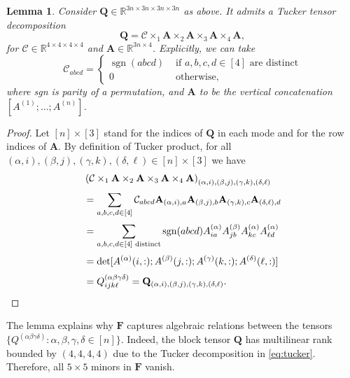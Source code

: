 \documentclass[11pt]{amsart}
\newtheorem{lemma}{Lemma}
\begin{document}
\begin{lemma}
\label{lem:identity}
Consider $\mathbf{Q} \in \mathbb{R}^{3n \times 3n \times 3n \times 3n}$ as above.  
It admits a Tucker tensor decomposition
\begin{equation}\label{eq:tucker}
\mathbf{Q} = \mathcal{C} \times_1 \mathbf{A} \times_2 \mathbf{A} \times_3 \mathbf{A} \times_4 \mathbf{A},
\end{equation}
for $\mathcal{C} \in \mathbb{R}^{4 \times 4 \times 4 \times 4}$ and $\mathbf{A} \in \mathbb{R}^{3n \times 4}$.  
Explicitly, we can take 
\begin{equation*}
\mathcal{C}_{abcd} = 
\begin{cases}
\operatorname{sgn}(abcd) & \text{ if } a,b,c,d \in [4] \text{ are distinct} \\
0 & \text{ otherwise},
\end{cases}
\end{equation*}
where sgn is parity of a permutation, and $\mathbf{A}$ to be the vertical concatenation $[A^{(1)}; \dots ; A^{(n)}]$.
\end{lemma}
\begin{proof}
Let $[n] \times [3]$ stand for the indices of $\mathbf{Q}$ in each mode and for the row indices of $\mathbf{A}$.
By definition of Tucker product, for all $(\alpha, i), (\beta, j), (\gamma, k), (\delta, \ell) \in [n] \times [3]$ we have
\begin{align*}
  &\left(\mathcal{C} \times_1 \mathbf{A} \times_2 \mathbf{A} \times_3 \mathbf{A} \times_4 \mathbf{A}\right)_{(\alpha, i), (\beta, j), (\gamma, k), (\delta, \ell)}  \\[0.25em] 
  &= \sum_{a,b,c,d \in [4]} \mathcal{C}_{abcd} \mathbf{A}_{(\alpha, i), a} \mathbf{A}_{(\beta, j), b} \mathbf{A}_{(\gamma, k), c} \mathbf{A}_{(\delta, \ell), d} \\[0.25em]
  &= \sum_{a,b,c,d \in [4] \text{ distinct}} \operatorname{sgn}(abcd) A^{(\alpha)}_{ia} A^{(\beta)}_{jb} A^{(\alpha)}_{kc} A^{(\alpha)}_{\ell d} \\[0.25em]
  &= \det [A^{(\alpha)}(i, :); A^{(\beta)}(j, :); A^{(\gamma)}(k, :); A^{(\delta)}(\ell, :)] \\[0.25em]
  &= Q^{(\alpha \beta \gamma \delta)}_{i j k \ell} = \mathbf{Q}_{(\alpha, i), (\beta, j), (\gamma, k), (\delta, \ell)}. \qedhere
\end{align*} 
\end{proof}


The lemma explains why $\mathbf{F}$ captures algebraic relations between the tensors $\{Q^{(\alpha \beta \gamma \delta)} : \alpha, \beta, \gamma, \delta \in [n] \}$.  
Indeed, the block tensor $\mathbf{Q}$ has multilinear rank bounded by $(4,4,4,4)$ due to the Tucker decomposition in \eqref{eq:tucker}.
Therefore, all $5 \times 5$ minors in $\mathbf{F}$ vanish.
\end{document}
